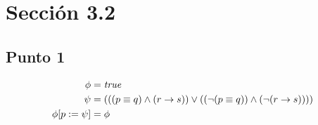 \documentclass{article}
\newlength{\logicv}
\newenvironment{logicenv}[2][0]{
  \begin{tcolorbox}[demo, title = #2]
  \vspace*{#1\logicv}
}{
  \end{tcolorbox}
  \vspace*{-.5cm}
}
\begin{document}
\section{Sección 3.2}

\subsection{Punto 1}

\begin{logicenv}{punto 1}
    \begin{alignat*}{1}
        \phi &= \textrm{\textit{true}}\\
        \psi &= (((p \equiv q) \land (r \to s)) \lor ((\neg(p \equiv q)) \land (\neg(r \to s))))\\
        \phi[p := \psi] &= \phi
    \end{alignat*}
\end{logicenv}
\end{document}
